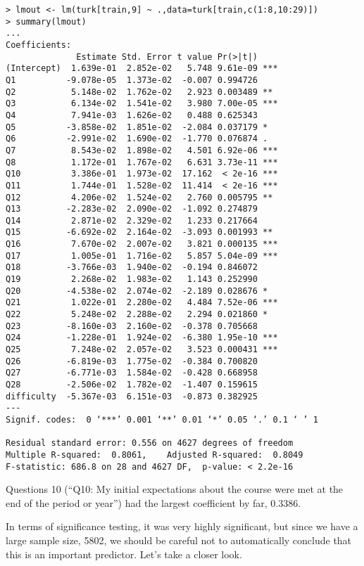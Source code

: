 \begin{verbatim}
> lmout <- lm(turk[train,9] ~ .,data=turk[train,c(1:8,10:29)])
> summary(lmout)
...
Coefficients:
              Estimate Std. Error t value Pr(>|t|)    
(Intercept)  1.639e-01  2.852e-02   5.748 9.61e-09 ***
Q1          -9.078e-05  1.373e-02  -0.007 0.994726    
Q2           5.148e-02  1.762e-02   2.923 0.003489 ** 
Q3           6.134e-02  1.541e-02   3.980 7.00e-05 ***
Q4           7.941e-03  1.626e-02   0.488 0.625343    
Q5          -3.858e-02  1.851e-02  -2.084 0.037179 *  
Q6          -2.991e-02  1.690e-02  -1.770 0.076874 .  
Q7           8.543e-02  1.898e-02   4.501 6.92e-06 ***
Q8           1.172e-01  1.767e-02   6.631 3.73e-11 ***
Q10          3.386e-01  1.973e-02  17.162  < 2e-16 ***
Q11          1.744e-01  1.528e-02  11.414  < 2e-16 ***
Q12          4.206e-02  1.524e-02   2.760 0.005795 ** 
Q13         -2.283e-02  2.090e-02  -1.092 0.274879    
Q14          2.871e-02  2.329e-02   1.233 0.217664    
Q15         -6.692e-02  2.164e-02  -3.093 0.001993 ** 
Q16          7.670e-02  2.007e-02   3.821 0.000135 ***
Q17          1.005e-01  1.716e-02   5.857 5.04e-09 ***
Q18         -3.766e-03  1.940e-02  -0.194 0.846072    
Q19          2.268e-02  1.983e-02   1.143 0.252990    
Q20         -4.538e-02  2.074e-02  -2.189 0.028676 *  
Q21          1.022e-01  2.280e-02   4.484 7.52e-06 ***
Q22          5.248e-02  2.288e-02   2.294 0.021860 *  
Q23         -8.160e-03  2.160e-02  -0.378 0.705668    
Q24         -1.228e-01  1.924e-02  -6.380 1.95e-10 ***
Q25          7.248e-02  2.057e-02   3.523 0.000431 ***
Q26         -6.819e-03  1.775e-02  -0.384 0.700820    
Q27         -6.771e-03  1.584e-02  -0.428 0.668958    
Q28         -2.506e-02  1.782e-02  -1.407 0.159615    
difficulty  -5.367e-03  6.151e-03  -0.873 0.382925    
---
Signif. codes:  0 ‘***’ 0.001 ‘**’ 0.01 ‘*’ 0.05 ‘.’ 0.1 ‘ ’ 1

Residual standard error: 0.556 on 4627 degrees of freedom
Multiple R-squared:  0.8061,    Adjusted R-squared:  0.8049 
F-statistic: 686.8 on 28 and 4627 DF,  p-value: < 2.2e-16
\end{verbatim}

Questions 10 (``Q10:  My initial expectations about the course were met
at the end of the period or year'') had the largest coefficient by far,
0.3386.  

In terms of significance testing, it was very highly significant, but
since we have a large sample size, 5802, we should be careful not to
automatically conclude that this is an important predictor.  Let's take
a closer look.

